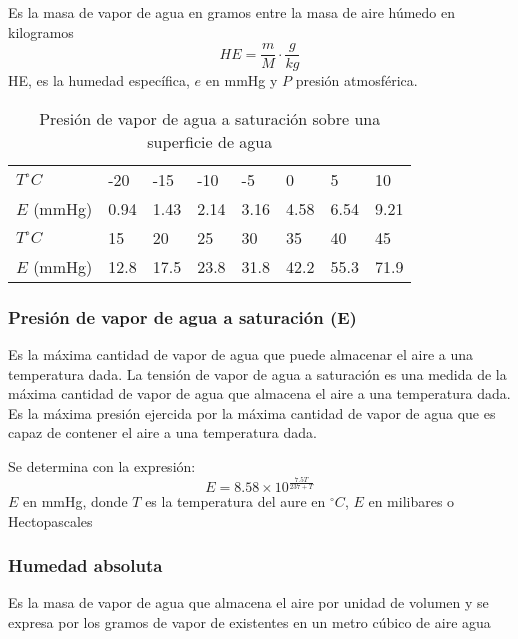 \begin{definition}
    Es la masa de vapor de agua en gramos entre la masa de aire
húmedo en kilogramos
\begin{equation}
    HE= \frac{m}{M} \cdot\frac{g}{kg}
\end{equation}
    HE, es la humedad específica, $e$ en mmHg y $P$ presión atmosférica.
\end{definition}

\begin{table}[h!]
    \centering
    \begin{tabular}{@{}llllllll@{}}
    $T^{\circ}C$ & -20  & -15  & -10  & -5   & 0    & 5    & 10   \\
    $E$ (mmHg)   & 0.94 & 1.43 & 2.14 & 3.16 & 4.58 & 6.54 & 9.21 \\
    $T^{\circ}C$ & 15   & 20   & 25   & 30   & 35   & 40   & 45   \\
    $E$ (mmHg)   & 12.8 & 17.5 & 23.8 & 31.8 & 42.2 & 55.3 & 71.9
    \end{tabular}
    \caption{Presión de vapor de agua a saturación sobre una superficie de agua}
    \label{tabma6}
    \end{table}
\subsubsection{Presión de vapor de agua a saturación (E)}

Es la máxima cantidad de vapor de agua que puede almacenar el aire a una temperatura dada.
La tensión de vapor de agua a saturación es una medida de la máxima cantidad de vapor de agua que almacena el aire a una temperatura dada.
Es la máxima presión ejercida por la máxima cantidad de vapor de agua que es capaz de contener el aire a una temperatura dada.

Se determina con la expresión:
\begin{equation}
    E = 8.58 \times 10^{\frac{7.5T}{237 + T}}
\end{equation}
$E$ en mmHg, donde $T$ es la temperatura del aure en $^{\circ}C$, $E$ en milibares o Hectopascales

\subsubsection{Humedad absoluta}
Es la masa de vapor de agua que almacena el aire por unidad de volumen y se expresa por los gramos de vapor de existentes en un metro cúbico de aire agua


